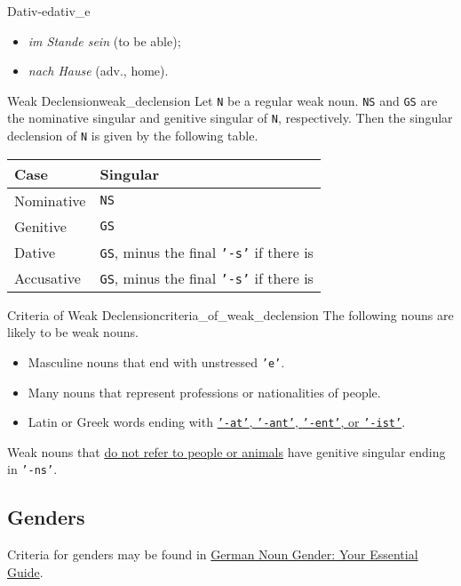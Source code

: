 \documentclass{article}
\begin{document}
\begin{example}{Dativ-e}{dativ_e}
    \begin{itemize}
        \item \textit{im Stande sein} (to be able);
        \item \textit{nach Hause} (adv., home).
    \end{itemize}
\end{example}

\begin{theorem}{Weak Declension}{weak_declension}
    Let \texttt{N} be a regular weak noun.
    \texttt{NS} and \texttt{GS} are the nominative singular and genitive singular of \texttt{N}, respectively.
    Then the singular declension of \texttt{N} is given by the following table.
    \begin{longtable}{ll}
        \toprule
        Case & Singular  \\
        \midrule
        Nominative & \texttt{NS} \\
        Genitive & \texttt{GS} \\
        Dative & \texttt{GS}, minus the final \texttt{'-s'} if there is \\
        Accusative & \texttt{GS}, minus the final \texttt{'-s'} if there is \\
        \bottomrule
    \end{longtable}
\end{theorem}

\begin{proposition}{Criteria of Weak Declension}{criteria_of_weak_declension}
    The following nouns are likely to be weak nouns.
    \begin{itemize}
        \item Masculine nouns that end with unstressed \texttt{'e'}.
        \item Many nouns that represent professions or nationalities of people.
        \item Latin or Greek words ending with \href{https://www.germanveryeasy.com/m/noun-declension}{\texttt{'-at'}, \texttt{'-ant'}, \texttt{'-ent'}, or \texttt{'-ist'}}.
    \end{itemize}
    Weak nouns that \href{https://www.vistawide.com/german/grammar/german_nouns03.htm}{do not refer to people or animals} have genitive singular ending in \texttt{'-ns'}.
\end{proposition}

\subsection{Genders}

Criteria for genders may be found in \href{https://germanwithlaura.com/noun-gender/}{German Noun Gender: Your Essential Guide}.

% 
% 
\end{document}
